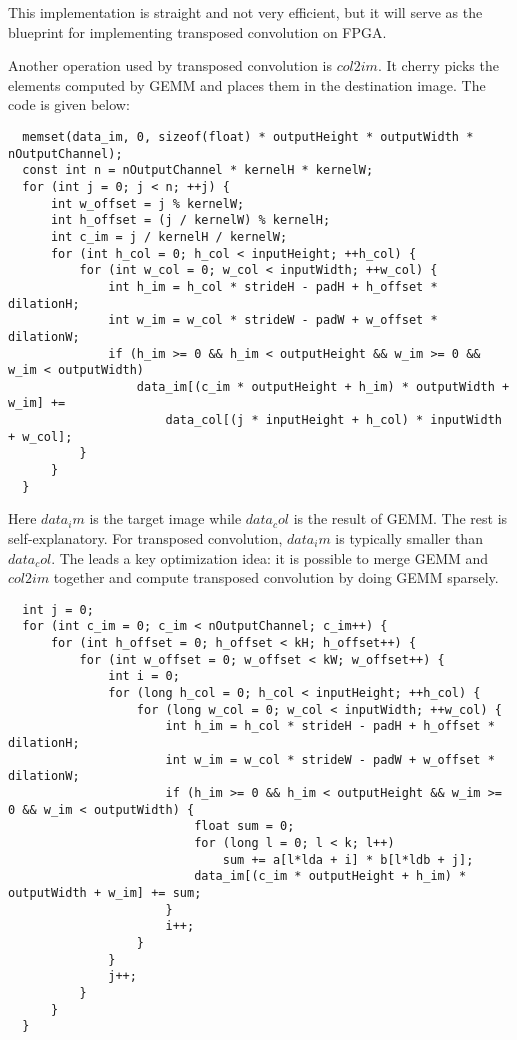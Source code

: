 This implementation is straight and not very efficient, but it will serve as the blueprint for implementing
transposed convolution on FPGA.

Another operation used by transposed convolution is $col2im$. It cherry picks the elements computed by GEMM
and places them in the destination image. The code is given below:

\begin{code}
  \begin{verbatim}
  memset(data_im, 0, sizeof(float) * outputHeight * outputWidth * nOutputChannel);
  const int n = nOutputChannel * kernelH * kernelW;
  for (int j = 0; j < n; ++j) {
      int w_offset = j % kernelW;
      int h_offset = (j / kernelW) % kernelH;
      int c_im = j / kernelH / kernelW;
      for (int h_col = 0; h_col < inputHeight; ++h_col) {
          for (int w_col = 0; w_col < inputWidth; ++w_col) {
              int h_im = h_col * strideH - padH + h_offset * dilationH;
              int w_im = w_col * strideW - padW + w_offset * dilationW;
              if (h_im >= 0 && h_im < outputHeight && w_im >= 0 && w_im < outputWidth)
                  data_im[(c_im * outputHeight + h_im) * outputWidth + w_im] +=
                      data_col[(j * inputHeight + h_col) * inputWidth + w_col];
          }
      }
  }
  \end{verbatim}
  \label{code:col2im}
\end{code}

Here $data_im$ is the target image while $data_col$ is the result of GEMM. The rest is self-explanatory.
For transposed convolution, $data_im$ is typically smaller than $data_col$. The leads a key optimization
idea: it is possible to merge GEMM and $col2im$ together and compute transposed convolution by doing GEMM
sparsely.

\begin{code}
  \begin{verbatim}
  int j = 0;
  for (int c_im = 0; c_im < nOutputChannel; c_im++) {
      for (int h_offset = 0; h_offset < kH; h_offset++) {
          for (int w_offset = 0; w_offset < kW; w_offset++) {
              int i = 0;
              for (long h_col = 0; h_col < inputHeight; ++h_col) {
                  for (long w_col = 0; w_col < inputWidth; ++w_col) {
                      int h_im = h_col * strideH - padH + h_offset * dilationH;
                      int w_im = w_col * strideW - padW + w_offset * dilationW;
                      if (h_im >= 0 && h_im < outputHeight && w_im >= 0 && w_im < outputWidth) {
                          float sum = 0;
                          for (long l = 0; l < k; l++)
                              sum += a[l*lda + i] * b[l*ldb + j];
                          data_im[(c_im * outputHeight + h_im) * outputWidth + w_im] += sum;
                      }
                      i++;
                  }
              }
              j++;
          }
      }
  }
  \end{verbatim}
  \label{code:transposed_convolution}
\end{code}

\clearpage %

